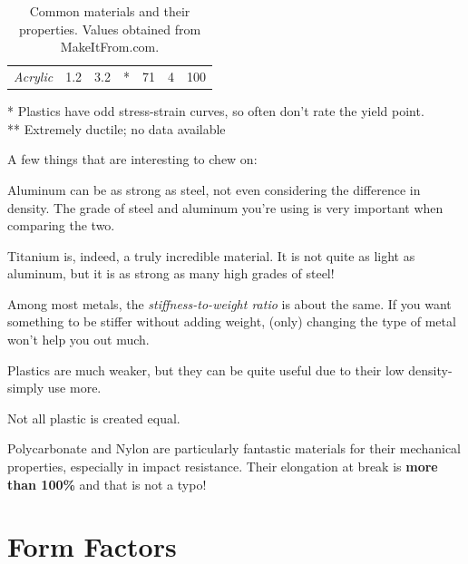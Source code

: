\documentclass[10pt,letterpaper]{book}
\begin{document}
\begin{table}[H]
\begin{tabular}{rrrrrrr}
\textit{Acrylic}                                                                        & 1.2                                                                                                          & 3.2                                                                                           & *                                                                                      & 71                                                                                   & 4                                                                                           & 100                                                                                          
\end{tabular}
* Plastics have odd stress-strain curves, so often don't rate the yield point. \\
** Extremely ductile; no data available
\caption{Common materials and their properties. Values obtained from MakeItFrom.com.}
\end{table}

A few things that are interesting to chew on:
\begin{asparaenum}[a)]
	\item Aluminum can be as strong as steel, not even considering the difference in density. The grade of steel and aluminum you're using is very important when comparing the two.
	\item Titanium is, indeed, a truly incredible material. It is not quite as light as aluminum, but it is as strong as many high grades of steel!
	\item Among most metals, the \textit{stiffness-to-weight ratio} is about the same. If you want something to be stiffer without adding weight, (only) changing the type of metal won't help you out much.
	\item Plastics are much weaker, but they can be quite useful due to their low density- simply use more.
	\item Not all plastic is created equal.
	\item Polycarbonate and Nylon are particularly fantastic materials for their mechanical properties, especially in impact resistance. Their elongation at break is \textbf{more than 100\%} and that is not a typo!
\end{asparaenum}

 \section{Form Factors}
 
\end{document}
